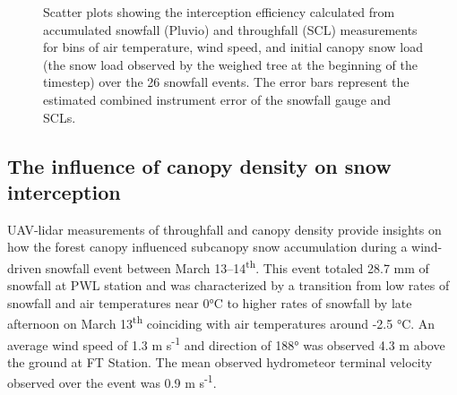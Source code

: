 \documentclass[
  letterpaper,
  DIV=11,
  numbers=noendperiod]{scrartcl}
\begin{document}
\begin{figure}[H]


\caption{\label{fig-scl-ip-bins}Scatter plots showing the interception
efficiency calculated from accumulated snowfall (Pluvio) and throughfall
(SCL) measurements for bins of air temperature, wind speed, and initial
canopy snow load (the snow load observed by the weighed tree at the
beginning of the timestep) over the 26 snowfall events. The error bars
represent the estimated combined instrument error of the snowfall gauge
and SCLs.}

\end{figure}%

\subsection{The influence of canopy density on snow
interception}\label{the-influence-of-canopy-density-on-snow-interception}

UAV-lidar measurements of throughfall and canopy density provide
insights on how the forest canopy influenced subcanopy snow accumulation
during a wind-driven snowfall event between March
13--14\textsuperscript{th}. This event totaled 28.7 mm of snowfall at
PWL station and was characterized by a transition from low rates of
snowfall and air temperatures near 0°C to higher rates of snowfall by
late afternoon on March 13\textsuperscript{th} coinciding with air
temperatures around -2.5 °C. An average wind speed of 1.3 m
s\textsuperscript{-1} and direction of 188° was observed 4.3 m above the
ground at FT Station. The mean observed hydrometeor terminal velocity
observed over the event was 0.9 m s\textsuperscript{-1}.
\end{document}
